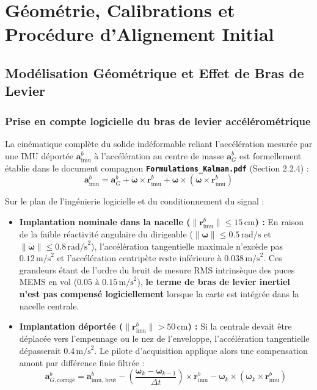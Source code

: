 \documentclass[../Implementation.tex]{subfiles}
\begin{document}
\section{Géométrie, Calibrations et Procédure d'Alignement Initial}

\subsection{Modélisation Géométrique et Effet de Bras de Levier}

\subsubsection{Prise en compte logicielle du bras de levier accélérométrique}
La cinématique complète du solide indéformable reliant l'accélération mesurée par une IMU déportée $\mathbf{a}_{\text{imu}}^b$ à l'accélération au centre de masse $\mathbf{a}_G^b$ est formellement établie dans le document compagnon \textbf{\texttt{Formulations\_Kalman.pdf}} (Section 2.2.4) :
\begin{equation}
    \mathbf{a}_{\text{imu}}^b = \mathbf{a}_G^b + \dot{\boldsymbol{\omega}} \times \mathbf{r}_{\text{imu}}^b + \boldsymbol{\omega} \times (\boldsymbol{\omega} \times \mathbf{r}_{\text{imu}}^b)
\end{equation}

Sur le plan de l'ingénierie logicielle et du conditionnement du signal :
\begin{itemize}
    \item \textbf{Implantation nominale dans la nacelle ($\|\mathbf{r}_{\text{imu}}^b\| \le 15\,\text{cm}$) :}
    En raison de la faible réactivité angulaire du dirigeable ($\|\boldsymbol{\omega}\| \le 0.5\,\text{rad/s}$ et $\|\dot{\boldsymbol{\omega}}\| \le 0.8\,\text{rad/s}^2$), l'accélération tangentielle maximale n'excède pas $0.12\,\text{m/s}^2$ et l'accélération centripète reste inférieure à $0.038\,\text{m/s}^2$. Ces grandeurs étant de l'ordre du bruit de mesure RMS intrinsèque des puces MEMS en vol ($0.05\text{ à }0.15\,\text{m/s}^2$), \textbf{le terme de bras de levier inertiel n'est pas compensé logiciellement} lorsque la carte est intégrée dans la nacelle centrale.
    \item \textbf{Implantation déportée ($\|\mathbf{r}_{\text{imu}}^b\| > 50\,\text{cm}$) :}
    Si la centrale devait être déplacée vers l'empennage ou le nez de l'enveloppe, l'accélération tangentielle dépasserait $0.4\,\text{m/s}^2$. Le pilote d'acquisition applique alors une compensation amont par différence finie filtrée :
    \begin{equation}
        \mathbf{a}_{G,\text{corrigé}}^b = \mathbf{a}_{\text{imu, brut}}^b - \left( \frac{\boldsymbol{\omega}_k - \boldsymbol{\omega}_{k-1}}{\Delta t} \right) \times \mathbf{r}_{\text{imu}}^b - \boldsymbol{\omega}_k \times (\boldsymbol{\omega}_k \times \mathbf{r}_{\text{imu}}^b)
    \end{equation}
\end{itemize}
\end{document}

